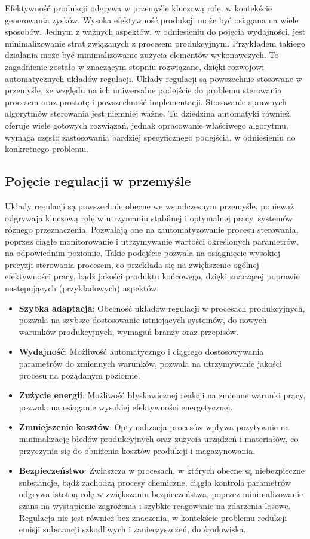 \documentclass[a4paper,twoside,12pt]{book}
\begin{document}
Efektywność produkcji odgrywa w przemyśle kluczową rolę, w kontekście generowania zysków. Wysoka efektywność produkcji może być osiągana na wiele sposobów. Jednym z ważnych aspektów, w odniesieniu do pojęcia wydajności, jest minimalizowanie strat związanych z procesem produkcyjnym. Przykładem takiego działania może być minimalizowanie zużycia elementów wykonawczych. To zagadnienie zostało w znaczącym stopniu rozwiązane, dzięki rozwojowi automatycznych układów regulacji. Układy regulacji są powszechnie stosowane w przemyśle, ze względu na ich uniwersalne podejście do problemu sterowania procesem oraz prostotę i powszechność implementacji. Stosowanie sprawnych algorytmów sterowania jest niemniej ważne. Tu dziedzina automatyki również oferuje wiele gotowych rozwiązań, jednak opracowanie właściwego algorytmu, wymaga często zastosowania bardziej specyficznego podejścia, w odniesieniu do konkretnego problemu.

\subsection{Pojęcie regulacji w przemyśle}
Układy regulacji są powszechnie obecne we wspołczesnym przemyśle, ponieważ odgrywaja kluczową rolę w utrzymaniu stabilnej i optymalnej pracy, systemów różnego przeznaczenia. Pozwalają one na zautomatyzowanie procesu sterowania, poprzez ciągłe monitorowanie i utrzymywanie wartości określonych parametrów, na odpowiednim poziomie. Takie podejście pozwala na osiągnięcie wysokiej precyzji sterowania procesem, co przekłada się na zwiększenie ogólnej efektywności pracy, bądź jakości produktu końcowego, dzięki znaczącej poprawie następujących (przykładowych) aspektów:

\begin{itemize}
	\item \textbf{Szybka adaptacja}: Obecność układów regulacji w procesach produkcyjnych, pozwala na szybsze dostosowanie istniejących systemów, do nowych warunków produkcyjnych, wymagań branży oraz przepisów.
	\item \textbf{Wydajność}: Możliwość automatyczngo i ciągłego dostosowywania parametrów do zmiennych warunków, pozwala na utrzymywanie jakości procesu na pożądanym poziomie.
	\item \textbf{Zużycie energii}: Możliwość błyskawicznej reakcji na zmienne warunki pracy, pozwala na osiąganie wysokiej efektywności energetycznej.
	\item \textbf{Zmniejszenie kosztów}: Optymalizacja procesów wpływa pozytywnie na minimalizację błedów produkcyjnych oraz zużycia urządzeń i materiałów, co przyczynia się do obniżenia kosztów produkcji i magazynowania.
	\item \textbf{Bezpieczeństwo}: Zwłaszcza w procesach, w których obecne są niebezpieczne substancje, bądź zachodzą procesy chemiczne, ciągła kontrola parametrów odgrywa istotną rolę w zwiększaniu bezpieczeństwa, poprzez minimalizowanie szans na wystąpienie zagrożenia i szybkie reagowanie na zdarzenia losowe. Regulacja nie jest również bez znaczenia, w kontekście problemu redukcji emisji substancji szkodliwych i zanieczyszczeń, do środowiska.
\end{itemize}
\end{document}
